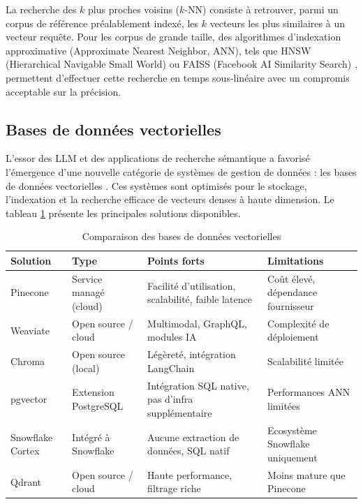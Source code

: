 La recherche des $k$ plus proches voisins ($k$-NN) consiste à retrouver, parmi un corpus de référence préalablement indexé, les $k$ vecteurs les plus similaires à un vecteur requête. Pour les corpus de grande taille, des algorithmes d'indexation approximative (Approximate Nearest Neighbor, ANN), tels que HNSW (Hierarchical Navigable Small World) \cite{logo:hnsw} ou FAISS (Facebook AI Similarity Search) \cite{logo:faiss}, permettent d'effectuer cette recherche en temps sous-linéaire avec un compromis acceptable sur la précision.

\subsection{Bases de données vectorielles}

L'essor des LLM et des applications de recherche sémantique a favorisé l'émergence d'une nouvelle catégorie de systèmes de gestion de données : les bases de données vectorielles \cite{logo:vector_db_survey}. Ces systèmes sont optimisés pour le stockage, l'indexation et la recherche efficace de vecteurs denses à haute dimension. Le tableau \ref{tab:vector_db} présente les principales solutions disponibles.

\begin{table}[h!]
\centering
\begin{tabularx}{\textwidth}{|l|X|X|X|}
  \hline
  \textbf{Solution} & \textbf{Type} & \textbf{Points forts} & \textbf{Limitations} \\
  \hline
  Pinecone \cite{logo:pinecone} & Service managé (cloud) & Facilité d'utilisation, scalabilité, faible latence & Coût élevé, dépendance fournisseur \\
  \hline
  Weaviate \cite{logo:weaviate} & Open source / cloud & Multimodal, GraphQL, modules IA & Complexité de déploiement \\
  \hline
  Chroma \cite{logo:chroma} & Open source (local) & Légèreté, intégration LangChain & Scalabilité limitée \\
  \hline
  pgvector \cite{logo:pgvector} & Extension PostgreSQL & Intégration SQL native, pas d'infra supplémentaire & Performances ANN limitées \\
  \hline
  Snowflake Cortex \cite{logo:snowflake_cortex} & Intégré à Snowflake & Aucune extraction de données, SQL natif & Ecosystème Snowflake uniquement \\
  \hline
  Qdrant \cite{logo:qdrant} & Open source / cloud & Haute performance, filtrage riche & Moins mature que Pinecone \\
  \hline
\end{tabularx}
\caption{Comparaison des bases de données vectorielles}
\label{tab:vector_db}
\end{table}

